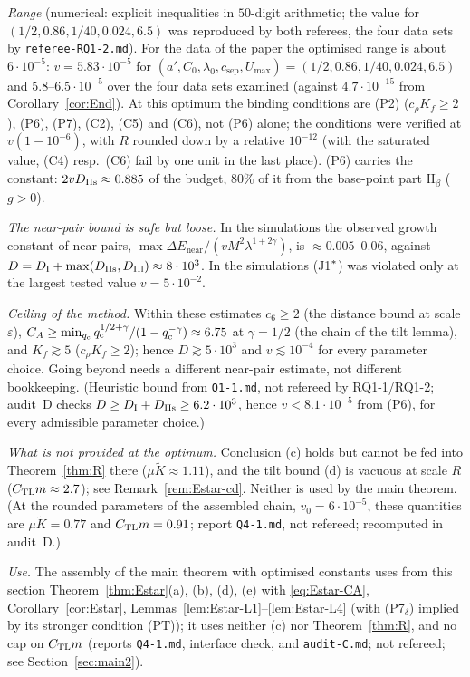 \begin{remark}[Status]
\emph{Range} (numerical: explicit inequalities in $50$-digit arithmetic; the value for $(1/2,\allowbreak0.86,\allowbreak1/40,\allowbreak0.024,\allowbreak6.5)$ was reproduced by
both referees, the four data sets by \texttt{referee-RQ1-2.md}). For the data of the paper
the optimised range is about $6\cdot10^{-5}$: $v=5.83\cdot10^{-5}$ for $(a',C_0,\lambda_0,c_{\mathrm{sep}},U_{\max})=
(1/2,0.86,1/40,0.024,6.5)$ and $5.8$--$6.5\cdot10^{-5}$ over the four data sets examined (against $4.7\cdot10^{-15}$ from
Corollary~\ref{cor:End}). At this optimum the binding conditions are \textup{(P2)} ($c_\rho K_f\ge2$), \textup{(P6)}, \textup{(P7)},
(C2), (C5) and (C6), not \textup{(P6)} alone; the conditions were verified at $v(1-10^{-6})$, with $R$ rounded down by a relative
$10^{-12}$ (with the saturated value, (C4) resp.\ (C6) fail by one unit in the last place). (P6) carries the constant:
$2vD_{\mathrm{IIs}}\approx0.885$ of the budget, $80\%$ of it from the base-point part $\mathrm{II}_\beta$ ($g>0$).

\emph{The near-pair bound is safe but loose.} In the simulations the observed growth constant of near pairs,
$\max\Delta E_{\mathrm{near}}/(vM^2\lambda^{1+2\gamma})$, is $\approx0.005$--$0.06$, against $D=D_{\mathrm I}+\max(D_{\mathrm{IIs}},D_{\mathrm{IIl}})\approx8\cdot10^3$.
In the simulations (J1$^{*}$) was violated only at the largest tested value $v=5\cdot10^{-2}$.

\emph{Ceiling of the method.} Within these estimates $c_6\ge2$ (the distance bound at scale $\varepsilon$), $C_A\ge
\min_{q_{\mathrm c}}q_{\mathrm c}^{1/2+\gamma}/(1-q_{\mathrm c}^{-\gamma})\approx6.75$ at $\gamma=1/2$ (the chain of the tilt lemma), and $K_f\gtrsim5$
($c_\rho K_f\ge2$); hence $D\gtrsim5\cdot10^3$ and $v\lesssim10^{-4}$ for every parameter choice. Going beyond needs a different
near-pair estimate, not different bookkeeping. (Heuristic bound from \texttt{Q1-1.md}, not refereed by RQ1-1/RQ1-2; audit~D
checks $D\ge D_{\mathrm I}+D_{\mathrm{IIs}}\ge6.2\cdot10^3$, hence $v<8.1\cdot10^{-5}$ from \textup{(P6)}, for every admissible parameter choice.)

\emph{What is not provided at the optimum.} Conclusion (c) holds but cannot be fed into Theorem~\ref{thm:R} there
($\mu\tilde K\approx1.11$), and the tilt bound (d) is vacuous at scale $R$ ($C_{\mathrm{TL}} m\approx2.7$); see Remark~\ref{rem:Estar-cd}.
Neither is used by the main theorem. (At the rounded parameters of the assembled chain, $v_0=6\cdot10^{-5}$, these quantities are
$\mu\tilde K=0.77$ and $C_{\mathrm{TL}} m=0.91$; report \texttt{Q4-1.md}, not refereed; recomputed in audit~D.)

\emph{Use.} The assembly of the main theorem with optimised constants uses from this section Theorem~\ref{thm:Estar}(a), (b), (d),
(e) with \eqref{eq:Estar-CA}, Corollary~\ref{cor:Estar}, Lemmas~\ref{lem:Estar-L1}--\ref{lem:Estar-L4} (with \textup{(P7$_\delta$)}
implied by its stronger condition (PT)); it uses neither (c) nor Theorem~\ref{thm:R}, and no cap on $C_{\mathrm{TL}} m$ (reports
\texttt{Q4-1.md}, interface check, and \texttt{audit-C.md}; not refereed; see Section~\ref{sec:main2}).
\end{remark}

